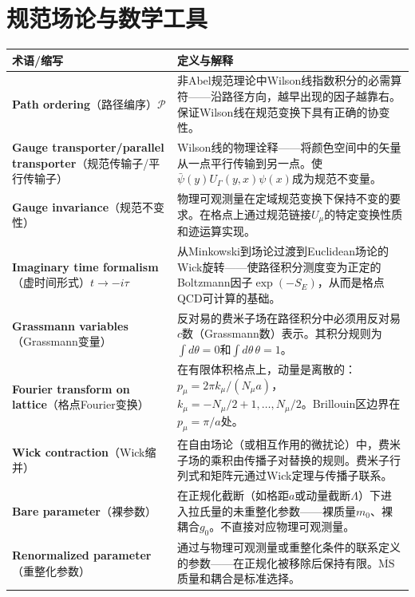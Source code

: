 \documentclass[12pt,a4paper]{ctexart}
\begin{document}
\section{规范场论与数学工具}

\begin{longtable}{p{3.5cm}p{9cm}}
\toprule
\textbf{术语/缩写} & \textbf{定义与解释} \\
\midrule
\endhead
\textbf{Path ordering}（路径编序）$\mathcal{P}$& 非Abel规范理论中Wilson线指数积分的必需算符——沿路径方向，越早出现的因子越靠右。保证Wilson线在规范变换下具有正确的协变性。\\
\textbf{Gauge transporter/parallel transporter}（规范传输子/平行传输子）& Wilson线的物理诠释——将颜色空间中的矢量从一点平行传输到另一点。使$\bar\psi(y)U_\Gamma(y,x)\psi(x)$成为规范不变量。\\
\textbf{Gauge invariance}（规范不变性）& 物理可观测量在定域规范变换下保持不变的要求。在格点上通过规范链接$U_\mu$的特定变换性质和迹运算实现。\\
\textbf{Imaginary time formalism}（虚时间形式）$t \to -i\tau$& 从Minkowski到场论过渡到Euclidean场论的Wick旋转——使路径积分测度变为正定的Boltzmann因子$\exp(-S_E)$，从而是格点QCD可计算的基础。\\
\textbf{Grassmann variables}（Grassmann变量）& 反对易的费米子场在路径积分中必须用反对易$c$数（Grassmann数）表示。其积分规则为$\int d\theta = 0$和$\int d\theta\,\theta = 1$。\\
\textbf{Fourier transform on lattice}（格点Fourier变换）& 在有限体积格点上，动量是离散的：$p_\mu = 2\pi k_\mu/(N_\mu a)$，$k_\mu = -N_\mu/2+1,\dots,N_\mu/2$。Brillouin区边界在$p_\mu = \pi/a$处。\\
\textbf{Wick contraction}（Wick缩并）& 在自由场论（或相互作用的微扰论）中，费米子场的乘积由传播子对替换的规则。费米子行列式和矩阵元通过Wick定理与传播子联系。\\
\textbf{Bare parameter}（裸参数）& 在正规化截断（如格距$a$或动量截断$\Lambda$）下进入拉氏量的未重整化参数——裸质量$m_0$、裸耦合$g_0$。不直接对应物理可观测量。\\
\textbf{Renormalized parameter}（重整化参数）& 通过与物理可观测量或重整化条件的联系定义的参数——在正规化被移除后保持有限。$\overline{\text{MS}}$质量和耦合是标准选择。\\
\bottomrule
\end{longtable}

\end{document}
